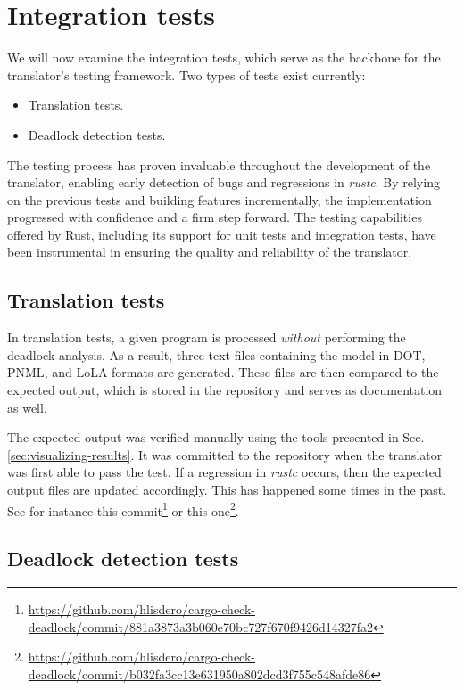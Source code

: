 \section{Integration tests}
\label{sec:integration-tests}

We will now examine the integration tests,
which serve as the backbone for the translator's testing framework.
Two types of tests exist currently:

\begin{itemize}
  \item Translation tests.
  \item Deadlock detection tests.
\end{itemize}

The testing process has proven invaluable throughout the development of the translator,
enabling early detection of bugs and regressions in \emph{rustc}.
By relying on the previous tests and building features incrementally,
the implementation progressed with confidence and a firm step forward.
The testing capabilities offered by Rust,
including its support for unit tests and integration tests,
have been instrumental in ensuring the quality and reliability of the translator.

\subsection{Translation tests}

In translation tests, a given program is processed
\emph{without} performing the deadlock analysis.
As a result, three text files containing the model
in DOT, \acrshort{PNML}, and \acrshort{LoLA} formats are generated.
These files are then compared to the expected output,
which is stored in the repository and serves as documentation as well.

The expected output was verified manually
using the tools presented in Sec. \ref{sec:visualizing-results}.
It was committed to the repository
when the translator was first able to pass the test.
If a regression in \emph{rustc} occurs,
then the expected output files are updated accordingly.
This has happened some times in the past.
See for instance
this commit\footnote{\url{https://github.com/hlisdero/cargo-check-deadlock/commit/881a3873a3b060e70bc727f670f9426d14327fa2}}
or this one\footnote{\url{https://github.com/hlisdero/cargo-check-deadlock/commit/b032fa3cc13e631950a802dcd3f755c548afde86}}.

\subsection{Deadlock detection tests}

